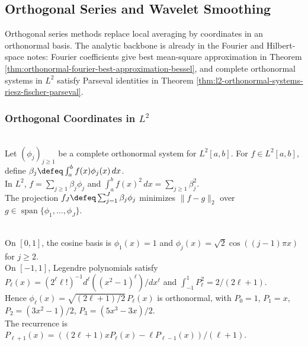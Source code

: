 \subsection{Orthogonal Series and Wavelet Smoothing}

Orthogonal series methods replace local averaging by coordinates in an orthonormal basis. The analytic backbone is already in the Fourier and Hilbert-space notes: Fourier coefficients give best mean-square approximation in Theorem \ref{thm:orthonormal-fourier-best-approximation-bessel}, and complete orthonormal systems in $L^2$ satisfy Parseval identities in Theorem \ref{thm:l2-orthonormal-systems-riesz-fischer-parseval}.

\subsubsection{Orthogonal Coordinates in $L^2$}

\begin{definition} \label{def:l2-orthogonal-series-coordinates} \\
Let $(\phi_j)_{j\geq1}$ be a complete orthonormal system for $L^2[a,b]$. For $f\in L^2[a,b]$, define $\beta_j\defeq\int_a^b f(x)\phi_j(x)\,dx$.\\
In $L^2$, $f=\sum_{j\geq1}\beta_j\phi_j$ and $\int_a^b f(x)^2\,dx=\sum_{j\geq1}\beta_j^2$.\\
The projection $f_J\defeq\sum_{j=1}^{J}\beta_j\phi_j$ minimizes $\|f-g\|_2$ over $g\in\operatorname{span}\{\phi_1,\ldots,\phi_J\}$.
\end{definition}

\begin{example} \label{ex:cosine-and-legendre-orthogonal-bases} \\
On $[0,1]$, the cosine basis is $\phi_1(x)=1$ and $\phi_j(x)=\sqrt2\cos((j-1)\pi x)$ for $j\geq2$.\\
On $[-1,1]$, Legendre polynomials satisfy $P_\ell(x)=(2^\ell\ell!)^{-1}d^\ell((x^2-1)^\ell)/dx^\ell$ and $\int_{-1}^{1}P_\ell^2=2/(2\ell+1)$.\\
Hence $\phi_\ell(x)=\sqrt{(2\ell+1)/2}\,P_\ell(x)$ is orthonormal, with $P_0=1$, $P_1=x$, $P_2=(3x^2-1)/2$, $P_3=(5x^3-3x)/2$.\\
The recurrence is $P_{\ell+1}(x)=((2\ell+1)xP_\ell(x)-\ell P_{\ell-1}(x))/(\ell+1)$.
\end{example}

